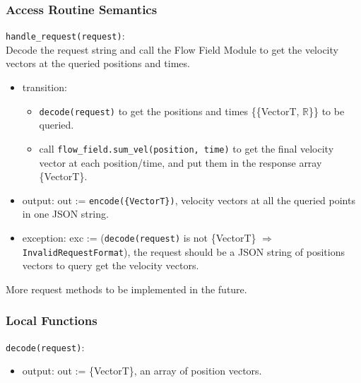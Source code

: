 \documentclass[12pt, titlepage]{article}
\begin{document}
\subsubsection{Access Routine Semantics}

\noindent \texttt{handle\_request(request)}:\\
Decode the request string and call the Flow Field Module to get the velocity vectors at the queried positions and times.
\begin{itemize}
\item transition:
  \begin{itemize}
    \item \texttt{decode(request)} to get the positions and times \{\{VectorT, $\mathbb{R}$\}\} to be queried.
    \item call \texttt{flow\_field.sum\_vel(position, time)} to get the final velocity vector at each position/time, and put them in the response array \{VectorT\}.
  \end{itemize}
\item output: out := \texttt{encode(\{VectorT\})}, velocity vectors at all the queried points in one JSON string.
\item exception: exc := (\texttt{decode(request)} is not \{VectorT\} $\Rightarrow$ \texttt{InvalidRequestFormat}), the request should be a JSON string of positions vectors to query get the velocity vectors.
\end{itemize}
\noindent More request methods to be implemented in the future.



\subsubsection{Local Functions}


\noindent \texttt{decode(request)}:
\begin{itemize}
\item output: out := \{VectorT\}, an array of position vectors.
\end{itemize}
\end{document}
